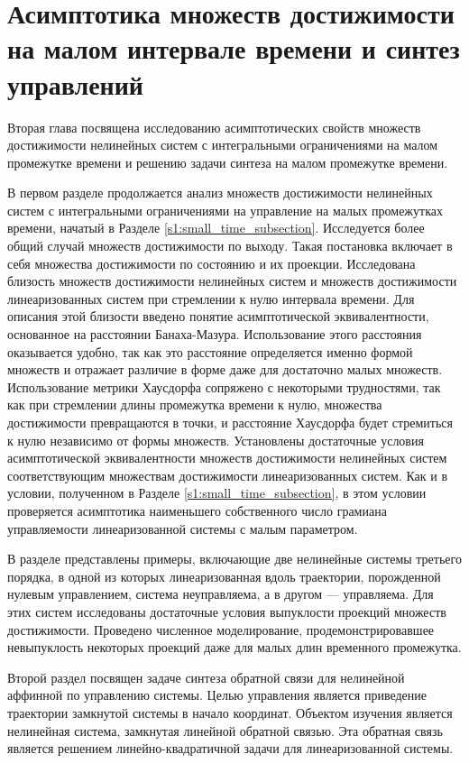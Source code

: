\documentclass[../main.tex]{subfiles}
\begin{document}
\clearpage
\section{Асимптотика множеств достижимости на малом интервале времени и синтез управлений}

Вторая глава посвящена исследованию асимптотических свойств множеств достижимости нелинейных систем с интегральными ограничениями на малом промежутке времени и решению задачи синтеза на малом промежутке времени. 

В первом разделе продолжается анализ множеств достижимости нелинейных систем с интегральными ограничениями на управление на малых промежутках времени, начатый в Разделе \ref{s1:small_time_subsection}. 
Исследуется более общий случай множеств достижимости по выходу.
Такая постановка включает в себя множества достижимости по состоянию и их проекции.
Исследована близость множеств достижимости нелинейных систем и множеств достижимости линеаризованных систем при стремлении к нулю интервала времени. 
Для описания этой близости введено понятие асимптотической эквивалентности, основанное на расстоянии Банаха-Мазура. 
Использование этого расстояния оказывается удобно, так как это расстояние определяется именно формой множеств и отражает различие в форме даже для достаточно малых множеств. 
Использование метрики Хаусдорфа сопряжено с некоторыми трудностями, так как при стремлении длины промежутка времени к нулю, множества достижимости превращаются в точки, и расстояние Хаусдорфа будет стремиться к нулю независимо от формы множеств.
Установлены достаточные условия асимптотической эквивалентности множеств достижимости нелинейных систем соответствующим множествам достижимости линеаризованных систем.
Как и в условии, полученном в Разделе \ref{s1:small_time_subsection}, в этом условии проверяется асимптотика наименьшего собственного число грамиана управляемости линеаризованной системы с малым параметром.

В разделе представлены примеры, включающие две нелинейные системы третьего порядка, в одной из которых линеаризованная вдоль траектории, порожденной нулевым управлением, система неуправляема, а в другом --- управляема.
Для этих систем исследованы достаточные условия выпуклости проекций множеств достижимости. 
Проведено численное моделирование, продемонстрировавшее невыпуклость некоторых проекций даже для малых длин временного промежутка.

Второй раздел посвящен задаче синтеза обратной связи для нелинейной аффинной по управлению системы. 
Целью управления является приведение траектории замкнутой системы в начало координат. 
Объектом изучения является нелинейная система, замкнутая линейной обратной связью. 
Эта обратная связь является решением линейно-квадратичной задачи для линеаризованной системы. 
\end{document}
